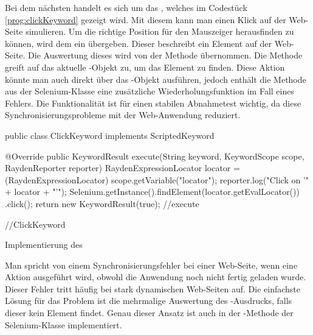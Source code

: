 \SuperPar
Bei dem nächsten  handelt es sich um das , welches im Codestück \ref{prog:clickKeyword} gezeigt wird. Mit diesem  kann man einen Klick auf der Web-Seite simulieren. Um die richtige Position für den Mauszeiger herausfinden zu können, wird dem  ein  übergeben. Dieser  beschreibt ein Element auf der Web-Seite. Die Auswertung dieses  wird von der Methode  übernommen. Die Methode greift auf das aktuelle -Objekt zu, um das Element zu finden. Diese Aktion könnte man auch direkt über das -Objekt ausführen, jedoch enthält die Methode  aus der Selenium-Klasse eine zusätzliche Wiederholungsfunktion im Fall eines Fehlers. Die Funktionalität ist für einen stabilen Abnahmetest wichtig, da diese Synchronisierungsprobleme mit der Web-Anwendung reduziert. 

\begin{program}
\begin{JavaCode}
public class ClickKeyword implements ScriptedKeyword {

  @Override
  public KeywordResult execute(String keyword, KeywordScope scope, 
	  RaydenReporter reporter) {
    RaydenExpressionLocator locator = 
		  (RaydenExpressionLocator) scope.getVariable("locator");
    reporter.log("Click on '" + locator + "'");
    Selenium.getInstance().findElement(locator.getEvalLocator())
		  .click();
    return new KeywordResult(true);
  } //execute
	
} //ClickKeyword
\end{JavaCode}
\caption{Implementierung des }
\label{prog:clickKeyword}
\end{program}

\SuperPar
Man spricht von einem Synchronisierungsfehler bei einer Web-Seite, wenn eine Aktion ausgeführt wird, obwohl die Anwendung noch nicht fertig geladen wurde. Dieser Fehler tritt häufig bei stark dynamischen Web-Seiten auf. Die einfachste Lösung für das Problem ist die mehrmalige Auswertung des -Ausdrucks, falls dieser kein Element findet. Genau dieser Ansatz ist auch in der -Methode der Selenium-Klasse implementiert.

